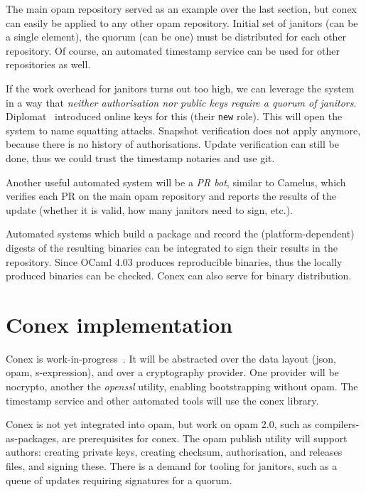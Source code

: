 \documentclass[nocopyrightspace]{sigplanconf}
\newcommand{\TODO}[1]{\textbf{[TODO: #1]}}
\begin{document}
The main opam repository served as an example over the last section, but conex can easily be applied to any other opam repository.
Initial set of janitors (can be a single element), the quorum (can be one) must be distributed for each other repository.
Of course, an automated timestamp service can be used for other repositories as well.

If the work overhead for janitors turns out too high, we can leverage the system in a way that \emph{neither authorisation nor public keys require a quorum of janitors}.
Diplomat~\cite{diplomat} introduced online keys for this (their \texttt{new} role).
This will open the system to name squatting attacks.
Snapshot verification does not apply anymore, because there is no history of authorisations.
Update verification can still be done, thus we could trust the timestamp notaries and use git.


Another useful automated system will be a \emph{PR bot}, similar to Camelus, which verifies each PR on the main opam repository and reports the results of the update (whether it is valid, how many janitors need to sign, etc.).

Automated systems which build a package and record the (platform-dependent) digests of the resulting binaries can be integrated to sign their results in the repository.
Since OCaml 4.03 produces reproducible binaries, thus the locally produced binaries can be checked.
Conex can also serve for binary distribution.

\section{Conex implementation} \label{sec:implementation}

Conex is work-in-progress~\cite{conex}.
It will be abstracted over the data layout (json, opam, s-expression), and over a cryptography provider.
One provider will be nocrypto, another the \emph{openssl} utility, enabling bootstrapping without opam.
The timestamp service and other automated tools will use the conex library.

Conex is not yet integrated into opam, but work on opam 2.0, such as compilers-as-packages, are prerequisites for conex.
The opam publish utility will support authors: creating private keys, creating checksum, authorisation, and releases files, and signing these.
There is a demand for tooling for janitors, such as a queue of updates requiring signatures for a quorum.
\end{document}

